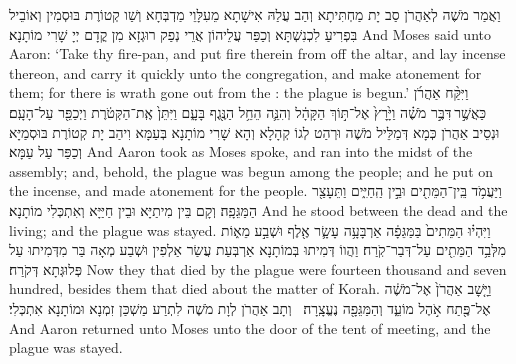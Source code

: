 {וַאֲמַר מֹשֶׁה לְאַהֲרֹן סַב יָת מַחְתִּיתָא וְהַב עֲלַהּ אִישָׁתָא מֵעִלָּוֵי מַדְבְּחָא וְשַׁו קְטוֹרֶת בּוּסְמִין וְאוֹבֵיל בִּפְרִיעַ לִכְנִשְׁתָּא וְכַפַּר עֲלֵיהוֹן אֲרֵי נְפַק רוּגְזָא מִן קֳדָם יְיָ שָׁרִי מוֹתָנָא׃}
{And Moses said unto Aaron: ‘Take thy fire-pan, and put fire therein from off the altar, and lay incense thereon, and carry it quickly unto the congregation, and make atonement for them; for there is wrath gone out from the \lord: the plague is begun.’}{}
{וַיִּקַּ֨ח אַהֲרֹ֜ן כַּאֲשֶׁ֣ר \legarmeh  דִּבֶּ֣ר מֹשֶׁ֗ה וַיָּ֙רׇץ֙ אֶל־תּ֣וֹךְ הַקָּהָ֔ל וְהִנֵּ֛ה הֵחֵ֥ל הַנֶּ֖גֶף בָּעָ֑ם וַיִּתֵּן֙ אֶֽת־הַקְּטֹ֔רֶת וַיְכַפֵּ֖ר עַל־הָעָֽם׃}
{וּנְסֵיב אַהֲרֹן כְּמָא דְּמַלֵּיל מֹשֶׁה וּרְהַט לְגוֹ קְהָלָא וְהָא שָׁרִי מוֹתָנָא בְּעַמָּא וִיהַב יָת קְטוֹרֶת בּוּסְמַיָּא וְכַפַּר עַל עַמָּא׃}
{And Aaron took as Moses spoke, and ran into the midst of the assembly; and, behold, the plague was begun among the people; and he put on the incense, and made atonement for the people.}{}
{וַיַּעֲמֹ֥ד בֵּֽין־הַמֵּתִ֖ים וּבֵ֣ין הַֽחַיִּ֑ים וַתֵּעָצַ֖ר הַמַּגֵּפָֽה׃
}
{וְקָם בֵּין מִיתַיָּא וּבֵין חַיַּיָּא וְאִתְכְּלִי מוֹתָנָא׃}
{And he stood between the dead and the living; and the plague was stayed.}{}
{וַיִּהְי֗וּ הַמֵּתִים֙ בַּמַּגֵּפָ֔ה אַרְבָּעָ֥ה עָשָׂ֛ר אֶ֖לֶף וּשְׁבַ֣ע מֵא֑וֹת מִלְּבַ֥ד הַמֵּתִ֖ים עַל־דְּבַר־קֹֽרַח׃}
{וַהֲווֹ דְּמִיתוּ בְּמוֹתָנָא אַרְבְּעַת עֲשַׂר אַלְפִין וּשְׁבַע מְאָה בַּר מִדְּמִיתוּ עַל פְּלוּגְּתָא דְּקֹרַח׃}
{Now they that died by the plague were fourteen thousand and seven hundred, besides them that died about the matter of Korah.}{}
{וַיָּ֤שׇׁב אַהֲרֹן֙ אֶל־מֹשֶׁ֔ה אֶל־פֶּ֖תַח אֹ֣הֶל מוֹעֵ֑ד וְהַמַּגֵּפָ֖ה נֶעֱצָֽרָה׃ \petucha }
{וְתָב אַהֲרֹן לְוָת מֹשֶׁה לִתְרַע מַשְׁכַּן זִמְנָא וּמוֹתָנָא אִתְכְּלִי׃}
{And Aaron returned unto Moses unto the door of the tent of meeting, and the plague was stayed.}{}
